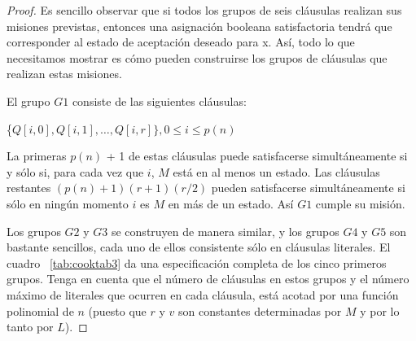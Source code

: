 \documentclass[a4paper, spanish, utf8]{memoir}
\begin{document}
\begin{proof}
  Es sencillo observar que si todos los grupos de seis cláusulas realizan sus
  misiones previstas, entonces una asignación booleana satisfactoria tendrá que
  corresponder al estado de aceptación deseado para x. Así, todo lo que
  necesitamos mostrar es cómo pueden construirse los grupos de cláusulas que
  realizan estas misiones.

  El grupo $G1$ consiste de las siguientes cláusulas:

  \begin{center} { \{$Q[i,0], Q[i,1], \dots, Q[i,r]\}, 0 \le i \le p(n)$ }
  \end{center}


  La primeras $p(n)$ + 1 de estas cláusulas puede satisfacerse simultáneamente
  si y sólo si, para cada vez que $i$, $M$ está en al menos un estado. Las
  cláusulas restantes $(p(n) + 1)(r + 1)(r / 2)$ pueden satisfacerse
  simultáneamente si sólo en ningún momento $i$ es $M$ en más de un estado. Así
  $G1$ cumple su misión.

  Los grupos $G2$ y $G3$ se construyen de manera similar, y los grupos $G4$ y
  $G5$ son bastante sencillos, cada uno de ellos consistente
  sólo en cláusulas literales. El cuadro ~\ref{tab:cooktab3} da una especificación completa de
  los cinco primeros grupos. Tenga en cuenta que el número de cláusulas en estos
  grupos y el número máximo de literales que ocurren en cada cláusula, está
  acotad por una función polinomial de $n$ (puesto que $r$ y $v$ son constantes
  determinadas por $M$ y por lo tanto por $L$).


\end{proof}
\end{document}
